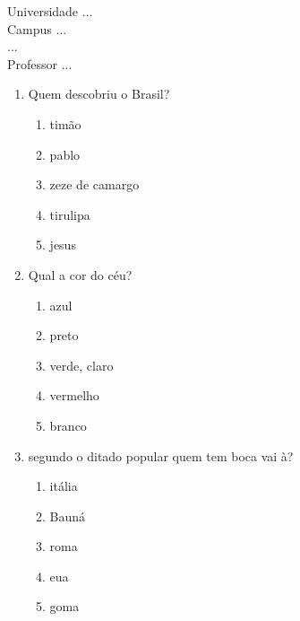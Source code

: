 \documentclass[10pt,a4paper,twocolumn]{report}
\begin{document}
\begin{flushleft}
Universidade ...\\
Campus ...\\
...\\
Professor ...\\
\end{flushleft}




 \begin{enumerate} 
    \item  Quem descobriu o Brasil?





    \begin{enumerate}
    \item  timão

\item  pablo

\item  zeze de camargo

\item  tirulipa

\item  jesus


    \end{enumerate} 
    \item  Qual a cor do céu?





    \begin{enumerate}
    \item  azul

\item  preto

\item  verde, claro

\item  vermelho

\item  branco


    \end{enumerate} 
    \item  segundo o ditado popular quem tem boca vai à?





    \begin{enumerate}
    \item  itália

\item  Bauná

\item  roma

\item  eua

\item  goma


    \end{enumerate}\end{enumerate} 
\end{document}
